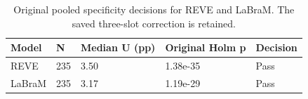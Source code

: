 \begin{longtable}{lllll}
\caption{Original pooled specificity decisions for REVE and LaBraM. The saved three-slot correction is retained.}\label{tab:cross_original_gates}\\
\toprule
Model & N & Median U (pp) & Original Holm p & Decision \\
\midrule
REVE & 235 & 3.50 & 1.38e-35 & Pass \\
LaBraM & 235 & 3.17 & 1.19e-29 & Pass \\
\bottomrule
\end{longtable}
